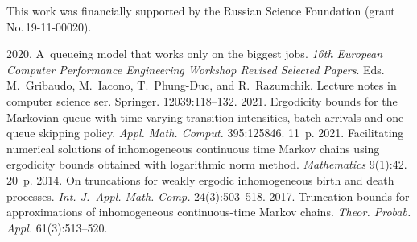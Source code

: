 

\vspace*{-15pt}

 \Ack
\noindent
This work was financially supported by the Russian Science Foundation (grant No.\,19-11-00020).


  \begin{multicols}{2}

\renewcommand{\bibname}{\protect\rmfamily References}

{\small\frenchspacing
 {%
 \begin{thebibliography}{9}
 2020. A~queueing model that works only on the biggest jobs. 
\textit{16th European Computer Performance Engineering Workshop Revised Selected Papers}. 
Eds. M.~Gribaudo, M.~Iacono, T.~Phung-Duc, and R.~Razumchik. 
Lecture notes in computer science ser. Springer. 12039:118--132.
 2021. Ergodicity bounds for the Markovian queue with time-varying transition intensities, 
 batch arrivals and one queue skipping policy.  \textit{Appl. Math. Comput.} 395:125846. 11~p.
 2021. Facilitating numerical solutions of inhomogeneous continuous time Markov 
 chains using ergodicity bounds obtained with logarithmic norm method. 
  \textit{Mathematics} 9(1):42. 20~p.
 2014. On truncations for weakly ergodic inhomogeneous birth and death processes. 
  \textit{Int. J.~Appl. Math. Comp.} 24(3):503--518.
 2017. Truncation bounds for approximations of inhomogeneous continuous-time Markov chains. 
 \textit{Theor. Probab. Appl.} 61(3):513--520.
 
 \end{thebibliography}

 }
 }

\end{multicols}

